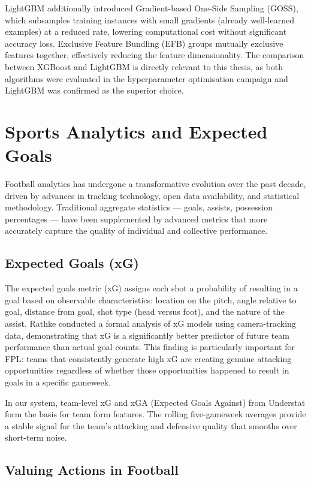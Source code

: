 LightGBM additionally introduced Gradient-based One-Side Sampling (GOSS), which subsamples training instances with small gradients (already well-learned examples) at a reduced rate, lowering computational cost without significant accuracy loss. Exclusive Feature Bundling (EFB) groups mutually exclusive features together, effectively reducing the feature dimensionality. The comparison between XGBoost and LightGBM is directly relevant to this thesis, as both algorithms were evaluated in the hyperparameter optimisation campaign and LightGBM was confirmed as the superior choice.

\section{Sports Analytics and Expected Goals}

Football analytics has undergone a transformative evolution over the past decade, driven by advances in tracking technology, open data availability, and statistical methodology. Traditional aggregate statistics — goals, assists, possession percentages — have been supplemented by advanced metrics that more accurately capture the quality of individual and collective performance.

\subsection{Expected Goals (xG)}

The expected goals metric (xG) assigns each shot a probability of resulting in a goal based on observable characteristics: location on the pitch, angle relative to goal, distance from goal, shot type (head versus foot), and the nature of the assist. Rathke \cite{rathke2017expected} conducted a formal analysis of xG models using camera-tracking data, demonstrating that xG is a significantly better predictor of future team performance than actual goal counts. This finding is particularly important for FPL: teams that consistently generate high xG are creating genuine attacking opportunities regardless of whether those opportunities happened to result in goals in a specific gameweek.

In our system, team-level xG and xGA (Expected Goals Against) from Understat form the basis for team form features. The rolling five-gameweek averages provide a stable signal for the team's attacking and defensive quality that smooths over short-term noise.

\subsection{Valuing Actions in Football}

